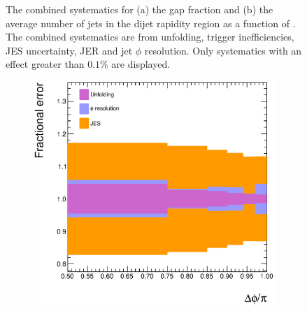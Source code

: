 \begin{figure}
\begin{subfigure}[b]{0.5\textwidth}
        \end{subfigure}%
\caption[Combined systematics for the gap fraction and average number of jets]{
The combined systematics for (a) the gap fraction and (b) the average number of jets in the dijet rapidity region as a function of \dy{}.
The combined systematics are from unfolding, trigger inefficiencies, JES uncertainty, JER and jet $\phi$ resolution.
Only systematics with an effect greater than $0.1\%$ are displayed.
\label{GBJ2:SysComb:GapNjet}}
\end{figure}
\begin{figure}
\centering
        \begin{subfigure}[b]{0.5\textwidth}
                \centering
                \includegraphics[width=\textwidth]{figures/GBJ2/FinalPlots/CrossSection.Inclusive.DPhiBins.2dY3.systematics.eps}
        \end{subfigure}%
        \begin{subfigure}[b]{0.5\textwidth}
                \centering

\end{subfigure}
\end{figure}
